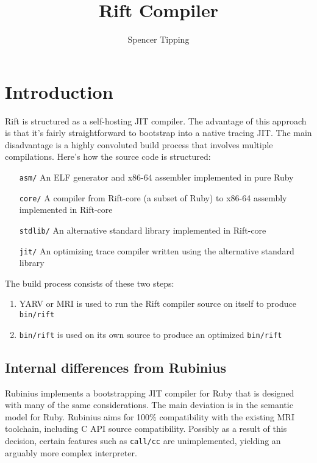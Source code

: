 \documentclass{report}
\title{Rift Compiler}
\author{Spencer Tipping}
\begin{document}
\maketitle{}
\tableofcontents{}

\chapter{Introduction}
  Rift is structured as a self-hosting JIT compiler. The advantage of this approach is that it's fairly straightforward to bootstrap into a native tracing JIT. The main disadvantage is a
  highly convoluted build process that involves multiple compilations. Here's how the source code is structured:

\begin{enumerate}
\item[\tt asm/]    An ELF generator and x86-64 assembler implemented in pure Ruby
\item[\tt core/]   A compiler from Rift-core (a subset of Ruby) to x86-64 assembly implemented in Rift-core
\item[\tt stdlib/] An alternative standard library implemented in Rift-core
\item[\tt jit/]    An optimizing trace compiler written using the alternative standard library
\end{enumerate}

  \noindent The build process consists of these two steps:

\begin{enumerate}
\item{YARV or MRI is used to run the Rift compiler source on itself to produce {\tt bin/rift}}
\item{{\tt bin/rift} is used on its own source to produce an optimized {\tt bin/rift}}
\end{enumerate}

\section{Internal differences from Rubinius}
    Rubinius implements a bootstrapping JIT compiler for Ruby that is designed with many of the same considerations. The main deviation is in the semantic model for Ruby. Rubinius aims for
    100\% compatibility with the existing MRI toolchain, including C API source compatibility. Possibly as a result of this decision, certain features such as {\tt call/cc} are unimplemented,
    yielding an arguably more complex interpreter.
\end{document}
